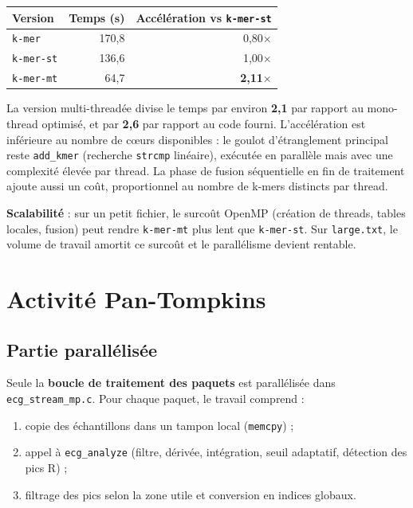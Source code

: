 \documentclass[a4paper,12pt]{article}
\begin{document}
\begin{center}
\begin{tabular}{|l|r|r|}
\hline
Version & Temps (s) & Accélération vs \texttt{k-mer-st} \\
\hline
\texttt{k-mer} & 170{,}8 & 0{,}80$\times$ \\
\texttt{k-mer-st} & 136{,}6 & 1{,}00$\times$ \\
\texttt{k-mer-mt} & 64{,}7 & \textbf{2{,}11}$\times$ \\
\hline
\end{tabular}
\end{center}

La version multi-threadée divise le temps par environ \textbf{2{,}1} par rapport au mono-thread optimisé, et par \textbf{2{,}6} par rapport au code fourni. L'accélération est inférieure au nombre de cœurs disponibles : le goulot d'étranglement principal reste \texttt{add\_kmer} (recherche \texttt{strcmp} linéaire), exécutée en parallèle mais avec une complexité élevée par thread. La phase de fusion séquentielle en fin de traitement ajoute aussi un coût, proportionnel au nombre de k-mers distincts par thread.

\textbf{Scalabilité} : sur un petit fichier, le surcoût OpenMP (création de threads, tables locales, fusion) peut rendre \texttt{k-mer-mt} plus lent que \texttt{k-mer-st}. Sur \texttt{large.txt}, le volume de travail amortit ce surcoût et le parallélisme devient rentable.

\newpage

\section{Activité Pan-Tompkins}

\subsection{Partie parallélisée}

Seule la \textbf{boucle de traitement des paquets} est parallélisée dans \texttt{ecg\_stream\_mp.c}. Pour chaque paquet, le travail comprend :
\begin{enumerate}
    \item copie des échantillons dans un tampon local (\texttt{memcpy}) ;
    \item appel à \texttt{ecg\_analyze} (filtre, dérivée, intégration, seuil adaptatif, détection des pics R) ;
    \item filtrage des pics selon la zone utile et conversion en indices globaux.
\end{enumerate}
\end{document}
